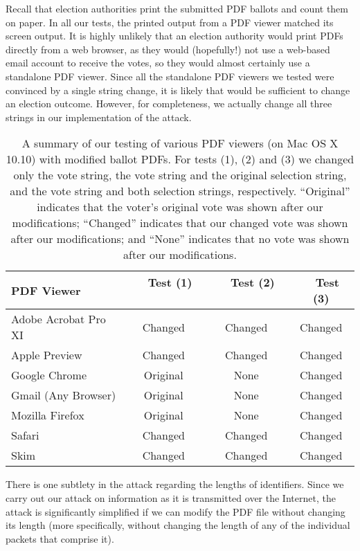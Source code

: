 \documentclass{article}
\begin{document}
Recall that election authorities print the submitted PDF ballots and
count them on paper. In all our tests, the printed output from a PDF
viewer matched its screen output. It is highly unlikely that an
election authority would print PDFs directly from a web browser, as
they would (hopefully!) not use a web-based email account to receive
the votes, so they would almost certainly use a standalone PDF
viewer. Since all the standalone PDF viewers we tested were convinced
by a single string change, it is likely that would be sufficient to
change an election outcome. However, for completeness, we actually
change all three strings in our implementation of the attack.

\begin{table}[bt]
\begin{center}
\begin{tabular}{l|ccc}
\textbf{PDF Viewer} & \ \ \textbf{Test (1)} \ \ & \ \ \textbf{Test (2)} \ \ & \ \ \textbf{Test (3)} \\
\hline
Adobe Acrobat Pro XI & Changed & Changed & Changed \\
Apple Preview & Changed & Changed & Changed \\
Google Chrome & Original & None & Changed \\
Gmail (Any Browser) & Original & None & Changed \\
Mozilla Firefox & Original & None & Changed \\
Safari & Changed & Changed & Changed \\
Skim & Changed & Changed & Changed \\
\hline
\end{tabular}
\end{center}
\caption{A summary of our testing of various PDF viewers (on Mac OS X
  10.10) with modified ballot PDFs. For tests (1), (2) and (3)
  we changed only the vote string, the vote string and the original
  selection string, and the vote string and both selection strings,
  respectively. ``Original'' indicates that the voter's original vote
  was shown after our modifications; ``Changed'' indicates that our
  changed vote was shown after our modifications; and ``None''
  indicates that no vote was shown after our modifications.}
\label{table:pdfviewers}
\end{table}

There is one subtlety in the attack regarding the lengths of
identifiers. Since we carry out our attack on information as it is
transmitted over the Internet, the attack is significantly simplified
if we can modify the PDF file without changing its length (more
specifically, without changing the length of any of the individual
packets that comprise it). 
\end{document}
